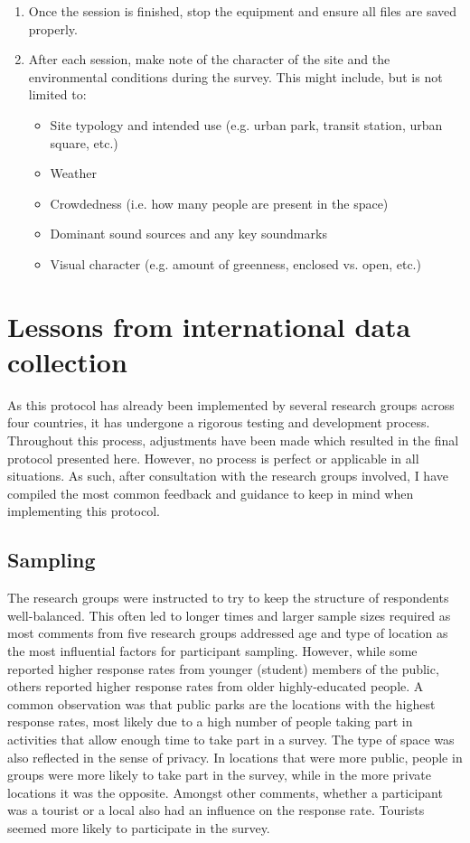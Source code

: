 \begin{enumerate}
     \item Once the session is finished, stop the equipment and ensure all files are saved properly.
     \item After each session, make note of the character of the site and the environmental conditions during the survey. This might include, but is not limited to:
           \begin{itemize}
             \item Site typology and intended use (e.g. urban park, transit station, urban square, etc.)
             \item Weather
             \item Crowdedness (i.e. how many people are present in the space)
             \item Dominant sound sources and any key soundmarks
             \item Visual character (e.g. amount of greenness, enclosed vs. open, etc.)
           \end{itemize}
   \end{enumerate}

\section{Lessons from international data collection}

 As this protocol has already been implemented by several research groups across four countries, it has undergone a rigorous testing and development process. Throughout this process, adjustments have been made which resulted in the final protocol presented here. However, no process is perfect or applicable in all situations. As such, after consultation with the research groups involved, I have compiled the most common feedback and guidance to keep in mind when implementing this protocol.

 \subsection{Sampling}

   The research groups were instructed to try to keep the structure of respondents well-balanced. This often led to longer times and larger sample sizes required as most comments from five research groups addressed age and type of location as the most influential factors for participant sampling. However, while some reported higher response rates from younger (student) members of the public, others reported higher response rates from older highly-educated people. A common observation was that public parks are the locations with the highest response rates, most likely due to a high number of people taking part in activities that allow enough time to take part in a survey. The type of space was also reflected in the sense of privacy. In locations that were more public, people in groups were more likely to take part in the survey, while in the more private locations it was the opposite. Amongst other comments, whether a participant was a tourist or a local also had an influence on the response rate. Tourists seemed more likely to participate in the survey.

